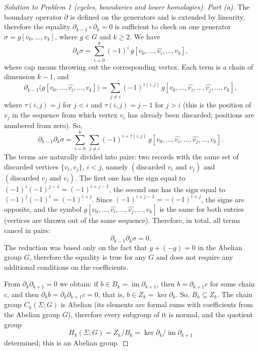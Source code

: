 \documentclass[a4paper,12pt]{report}
\begin{document}
\begin{proof}[Solution to Problem \textup{1} \textup{(}cycles, boundaries and lower homologies\textup{)}]
\textit{Part \textup{(a)}.} The boundary operator $\partial$ is defined on the generators and is extended by linearity, therefore the equality $\partial_{k-1}\circ\partial_k=0$ is sufficient to check on one generator $\sigma=g[v_0,\dots,v_k]$, where $g\in G$ and $k\ge2$. We have
\[
\partial_k\sigma=\sum_{i=0}^{k}(-1)^i\,g[v_0,\dots,\widehat{v_i},\dots,v_k],
\]
where cap means throwing out the corresponding vertex. Each term is a chain of dimension $k-1$, and
\[
\partial_{k-1}\bigl(g[v_0,\dots,\widehat{v_i},\dots,v_k]\bigr)
=\sum_{j\ne i}(-1)^{\tau(i,j)}\,g[v_0,\dots,\widehat{v_i},\dots,\widehat{v_j},\dots,v_k],
\]
where $\tau(i,j)=j$ for $j<i$ and $\tau(i,j)=j-1$ for $j>i$ \textup{(}this is the position of $v_j$ in the sequence from which vertex $v_i$\textup{ has already been discarded; } positions are numbered from zero\textup{)}. So,
\[
\partial_{k-1}\partial_k\sigma
=\sum_{i=0}^{k}\ \sum_{j\ne i}(-1)^{i+\tau(i,j)}\,g[v_0,\dots,\widehat{v_i},\dots,\widehat{v_j},\dots,v_k].
\]
The terms are naturally divided into pairs: two records with the same set of discarded vertices $\{v_i,v_j\}$, $i<j$, namely $(\text{discarded }v_i\text{ and }v_j)$ and $(\text{discarded }v_j\text{ and }v_i)$. The first one has the sign equal to $(-1)^{i}(-1)^{j-1}=(-1)^{i+j-1}$, the second one has the sign equal to $(-1)^{j}(-1)^{i}=(-1)^{i+j}$. Since $(-1)^{i+j-1}=-(-1)^{i+j}$, the signs are opposite, and the symbol $g[v_0,\dots,\widehat{v_i},\dots,\widehat{v_j},\dots,v_k]$ is the same for both entries \textup{(}vertices are thrown out of the same sequence\textup{)}. Therefore, in total, all terms cancel in pairs:
\[
\partial_{k-1}\partial_k\sigma=0 .
\]
The reduction was based only on the fact that $g+(-g)=0$ in the Abelian group $G$, therefore the equality is true for any $G$ and does not require any additional conditions on the coefficients.

From $\partial_k\partial_{k+1}=0$ we obtain: if $b\in B_k=\operatorname{im}\partial_{k+1}$, then $b=\partial_{k+1}c$ for some chain $c$, and then $\partial_k b=\partial_k\partial_{k+1}c=0$, that is, $b\in Z_k=\ker\partial_k$. So, $B_k\subseteq Z_k$. The chain group $C_k(\Sigma;G)$ is Abelian \textup{(}its elements are formal sums with coefficients from the Abelian group $G$\textup{)}, therefore every subgroup of it is normal, and the quotient group
\[
H_k(\Sigma;G)=Z_k/B_k=\ker\partial_k\big/\operatorname{im}\partial_{k+1}
\]
determined; this is an Abelian group.


\end{proof}
\end{document}
